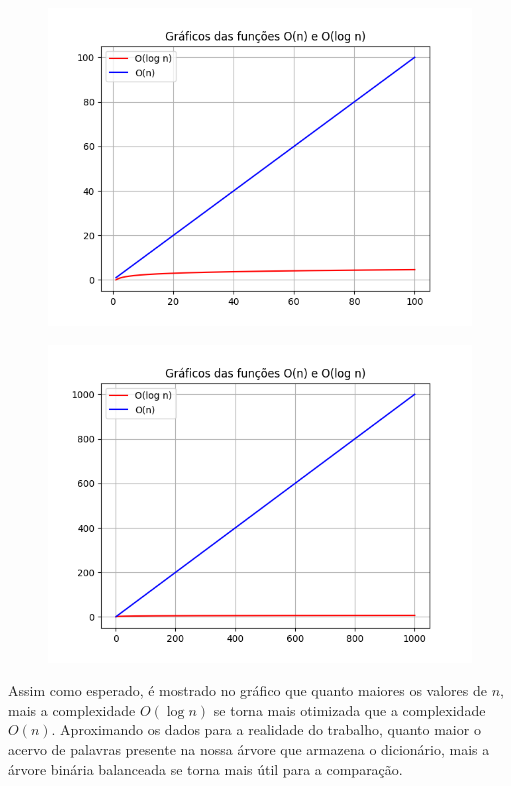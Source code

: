 \documentclass[12pt]{article}
\begin{document}
	\begin{center}
		\begin{figure}[!h]
			\includegraphics[scale = 0.6]{1a100.png}
		\end{figure}
	\end{center}

	\begin{center}
		\begin{figure}[!h]
			\includegraphics[scale = 0.6]{1a1000.png}
		\end{figure}
	\end{center}

	Assim como esperado, é mostrado no gráfico que quanto maiores os valores de $n$, mais a complexidade $O(\log n)$ se torna mais otimizada que a complexidade $O(n)$. Aproximando os dados para a realidade do trabalho, quanto maior o acervo de palavras presente na nossa árvore que armazena o dicionário, mais a árvore binária balanceada se torna mais útil para a comparação.
	
\end{document}
